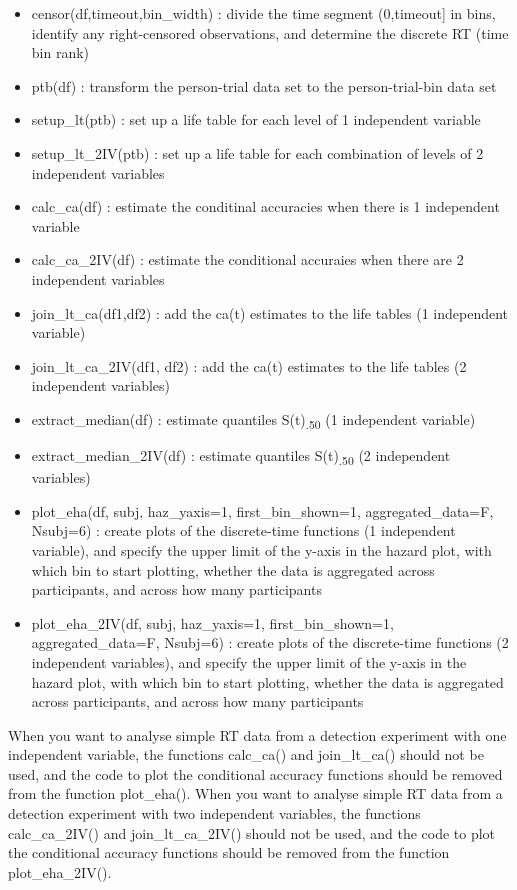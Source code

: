 \documentclass[
  man, donotrepeattitle,floatsintext]{apa6}
\providecommand{\tightlist}{%
  \setlength{\itemsep}{0pt}\setlength{\parskip}{0pt}}
\begin{document}
\begin{itemize}
\tightlist
\item
  censor(df,timeout,bin\_width) : divide the time segment (0,timeout{]} in bins, identify any right-censored observations, and determine the discrete RT (time bin rank)
\item
  ptb(df) : transform the person-trial data set to the person-trial-bin data set
\item
  setup\_lt(ptb) : set up a life table for each level of 1 independent variable
\item
  setup\_lt\_2IV(ptb) : set up a life table for each combination of levels of 2 independent variables
\item
  calc\_ca(df) : estimate the conditinal accuracies when there is 1 independent variable
\item
  calc\_ca\_2IV(df) : estimate the conditional accuraies when there are 2 independent variables
\item
  join\_lt\_ca(df1,df2) : add the ca(t) estimates to the life tables (1 independent variable)
\item
  join\_lt\_ca\_2IV(df1, df2) : add the ca(t) estimates to the life tables (2 independent variables)
\item
  extract\_median(df) : estimate quantiles S(t)\textsubscript{.50} (1 independent variable)
\item
  extract\_median\_2IV(df) : estimate quantiles S(t)\textsubscript{.50} (2 independent variables)
\item
  plot\_eha(df, subj, haz\_yaxis=1, first\_bin\_shown=1, aggregated\_data=F, Nsubj=6) : create plots of the discrete-time functions (1 independent variable), and specify the upper limit of the y-axis in the hazard plot, with which bin to start plotting, whether the data is aggregated across participants, and across how many participants
\item
  plot\_eha\_2IV(df, subj, haz\_yaxis=1, first\_bin\_shown=1, aggregated\_data=F, Nsubj=6) : create plots of the discrete-time functions (2 independent variables), and specify the upper limit of the y-axis in the hazard plot, with which bin to start plotting, whether the data is aggregated across participants, and across how many participants
\end{itemize}

When you want to analyse simple RT data from a detection experiment with one independent variable, the functions calc\_ca() and join\_lt\_ca() should not be used, and the code to plot the conditional accuracy functions should be removed from the function plot\_eha().
When you want to analyse simple RT data from a detection experiment with two independent variables, the functions calc\_ca\_2IV() and join\_lt\_ca\_2IV() should not be used, and the code to plot the conditional accuracy functions should be removed from the function plot\_eha\_2IV().
\end{document}
